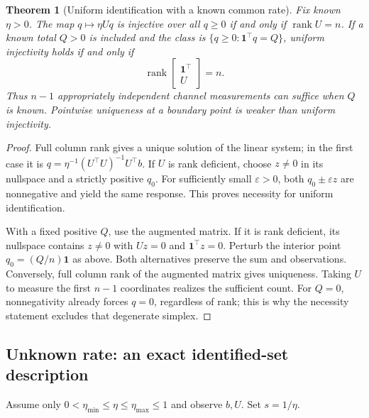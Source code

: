 \documentclass[11pt,a4paper]{article}
\newtheorem{theorem}{Theorem}[section]
\theoremstyle{definition}\newtheorem{definition}[theorem]{Definition}
\theoremstyle{remark}\newtheorem{remark}[theorem]{Remark}
\newcommand{\one}{\mathbf 1}\newcommand{\diag}{\operatorname{diag}}
\newcommand{\rank}{\operatorname{rank}}\newcommand{\supp}{\operatorname{supp}}
\begin{document}
\begin{theorem}[Uniform identification with a known common rate]\label{thm:group-known}
Fix known $\eta>0$. The map $q\mapsto\eta Uq$ is injective over all $q\ge0$ if and only if $\rank U=n$. If a known total $Q>0$ is included and the class is $\{q\ge0:\one^\top q=Q\}$, uniform injectivity holds if and only if
\[
 \rank\begin{bmatrix}\one^\top\\U\end{bmatrix}=n.
\]
Thus $n-1$ appropriately independent channel measurements can suffice when $Q$ is known. Pointwise uniqueness at a boundary point is weaker than uniform injectivity.
\end{theorem}
\begin{proof}
Full column rank gives a unique solution of the linear system; in the first case it is
$q=\eta^{-1}(U^\top U)^{-1}U^\top b$. If $U$ is rank deficient, choose $z\ne0$ in its nullspace and a strictly positive $q_0$. For sufficiently small $\varepsilon>0$, both $q_0\pm\varepsilon z$ are nonnegative and yield the same response. This proves necessity for uniform identification.

With a fixed positive $Q$, use the augmented matrix. If it is rank deficient, its nullspace contains $z\ne0$ with $Uz=0$ and $\one^\top z=0$. Perturb the interior point $q_0=(Q/n)\one$ as above. Both alternatives preserve the sum and observations. Conversely, full column rank of the augmented matrix gives uniqueness. Taking $U$ to measure the first $n-1$ coordinates realizes the sufficient count. For $Q=0$, nonnegativity already forces $q=0$, regardless of rank; this is why the necessity statement excludes that degenerate simplex.
\end{proof}

\subsection{Unknown rate: an exact identified-set description}
Assume only $0<\eta_{\min}\le\eta\le\eta_{\max}\le1$ and observe $b,U$. Set $s=1/\eta$.
\end{document}
